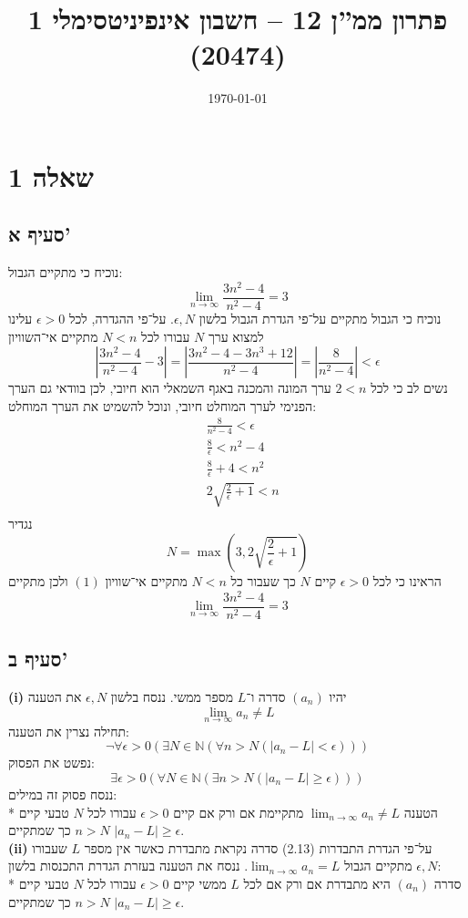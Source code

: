 \documentclass[a4paper]{article}
\title{פתרון ממ''ן 12 – חשבון אינפיניטסימלי 1 (20474)}
\author{\AUTHOR}
\date\today
\def\NN{\mathbb{N}}
\begin{document}
\maketitle
\section{שאלה 1}
\subsection{סעיף א'}
נוכיח כי מתקיים הגבול:
\[
	\lim_{n \to \infty} \frac{3n^2 - 4}{n^2 - 4} = 3
\]
נוכיח כי הגבול מתקיים על־פי הגדרת הגבול בלשון $\epsilon, N$.
על־פי ההגדרה, לכל $\epsilon > 0$ עלינו למצוא ערך $N$ עבורו לכל $N < n$
מתקיים אי־השוויון
\[
	\left| \frac{3n^2 - 4}{n^2 - 4} - 3 \right| =
	\left| \frac{3n^2 - 4 - 3n^3 + 12}{n^2 - 4} \right| =
	\left| \frac{8}{n^2 - 4} \right|
	< \epsilon \tag{1}
\]
נשים לב כי לכל $2 < n$ ערך המונה והמכנה באגף השמאלי הוא חיובי,
לכן בוודאי גם הערך הפנימי לערך המוחלט חיובי, ונוכל להשמיט את הערך המוחלט:
\begin{align*}
	& \frac{8}{n^2 - 4} < \epsilon \\
	& \frac{8}{\epsilon} < n^2 - 4 \\
	& \frac{8}{\epsilon} + 4 < n^2 \\
	& 2 \sqrt{\frac{2}{\epsilon} + 1} < n \\
\end{align*}
נגדיר
\[
	N = \max\left(3, 2 \sqrt{\frac{2}{\epsilon} + 1}\right)
\]
הראינו כי לכל $\epsilon > 0$ קיים $N$
כך שעבור כל $N < n$ מתקיים אי־שוויון $(1)$ ולכן מתקיים
\[
	\lim_{n \to \infty} \frac{3n^2 - 4}{n^2 - 4} = 3
\]

\subsection{סעיף ב'}
\textbf{(i)}
יהיו $(a_n)$ סדרה ו־$L$ מספר ממשי. ננסח בלשון $\epsilon, N$ את הטענה
\[
	\lim_{n \to \infty} a_n \ne L
\]
תחילה נצרין את הטענה:
\[
	\lnot \forall \epsilon > 0 (
	\exists N \in \NN (
	\forall n > N (\left| a_n - L \right| < \epsilon)))
\]
נפשט את הפסוק:
\[
	\exists \epsilon > 0 (
	\forall N \in \NN (
	\exists n > N (\left| a_n - L \right| \ge \epsilon)))
\]
ננסח פסוק זה במילים: \\*
הטענה $\lim_{n \to \infty} a_n \ne L$ מתקיימת אם ורק אם
קיים $\epsilon > 0$ עבורו לכל $N$ טבעי קיים $n > N$
כך שמתקיים $\left| a_n - L \right| \ge \epsilon$. \\
\textbf{(ii)}
על־פי הגדרת התבדרות (2.13) סדרה נקראת מתבדרת כאשר אין מספר $L$
שעבורו מתקיים הגבול $\lim_{n \to \infty} a_n = L$.
ננסח את הטענה בעזרת הגדרת התכנסות בלשון $\epsilon, N$: \\*
סדרה $(a_n)$ היא מתבדרת אם ורק אם
לכל $L$ ממשי קיים $\epsilon > 0$ עבורו לכל $N$ טבעי קיים $n > N$
כך שמתקיים $\left| a_n - L \right| \ge \epsilon$.
\end{document}
